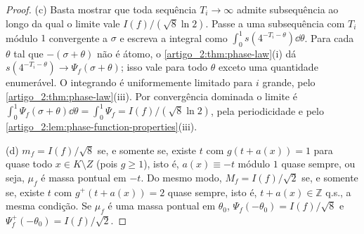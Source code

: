 \begin{proof}
(c) Basta mostrar que toda sequência $T_i\to\infty$ admite subsequência ao longo
da qual o limite vale $I(f)/(\sqrt8\ln2)$. Passe a uma subsequência com $T_i$
módulo $1$ convergente a $\sigma$ e escreva a integral como
$\int_0^1s(4^{-T_i-\theta})\dd\theta$. Para cada $\theta$ tal que
$-(\sigma+\theta)$ não é átomo, o \cref{artigo_2:thm:phase-law}(i) dá
$s(4^{-T_i-\theta})\to\Psi_f(\sigma+\theta)$; isso vale para todo $\theta$ exceto
uma quantidade enumerável. O integrando é uniformemente limitado para $i$
grande, pelo \cref{artigo_2:thm:phase-law}(iii). Por convergência dominada o limite é
$\int_0^1\Psi_f(\sigma+\theta)\dd\theta=\int_0^1\Psi_f=I(f)/(\sqrt8\ln2)$, pela
periodicidade e pelo \cref{artigo_2:lem:phase-function-properties}(iii).

(d) $m_f=I(f)/\sqrt8$ se, e somente se, existe $t$ com $g(t+a(x))=1$ para quase
todo $x\in K\setminus Z$ (pois $g\ge1$), isto é, $a(x)\equiv-t$ módulo $1$ quase
sempre, ou seja, $\mu_f$ é massa pontual em $-t$. Do mesmo modo,
$M_f=I(f)/\sqrt2$ se, e somente se, existe $t$ com $g^+(t+a(x))=2$ quase
sempre, isto é, $t+a(x)\in\mathbb Z$ q.s., a mesma condição. Se $\mu_f$ é uma massa
pontual em $\theta_0$, $\Psi_f(-\theta_0)=I(f)/\sqrt8$ e
$\Psi_f^+(-\theta_0)=I(f)/\sqrt2$.
\end{proof}

